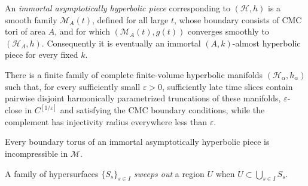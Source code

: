 \begin{definition}
\label{def:chow-iv-immortal-asymptotically-hyperbolic-piece}
An \emph{immortal asymptotically hyperbolic piece} corresponding to
\((\mathcal H,h)\) is a smooth family \(\mathcal M_A(t)\), defined for all
large \(t\), whose boundary consists of CMC tori of area \(A\), and for which
\((\mathcal M_A(t),g(t))\) converges smoothly to \((\mathcal H_A,h)\).
Consequently it is eventually an immortal \((A,k)\)-almost hyperbolic piece
for every fixed \(k\).
\end{definition}

\begin{proposition}
\label{prop:chow-iv-hyperbolic-collapsed-decomposition}
There is a finite family of complete finite-volume hyperbolic manifolds
\((\mathcal H_\alpha,h_\alpha)\) such that, for every sufficiently small
\(\varepsilon>0\), sufficiently late time slices contain pairwise disjoint
harmonically parametrized truncations of these manifolds, \(\varepsilon\)-close
in \(C^{[1/\varepsilon]}\) and satisfying the CMC boundary conditions, while
the complement has injectivity radius everywhere less than \(\varepsilon\).
\end{proposition}

\begin{proposition}
\label{prop:chow-iv-hyperbolic-boundary-incompressible-summary}
Every boundary torus of an immortal asymptotically hyperbolic piece is
incompressible in \(\mathcal M\).
\end{proposition}

\begin{definition}
\label{def:chow-iv-hypersurface-sweep-out}
A family of hypersurfaces \(\{S_s\}_{s\in I}\) \emph{sweeps out} a region
\(U\) when \(U\subset\bigcup_{s\in I}S_s\).
\end{definition}

